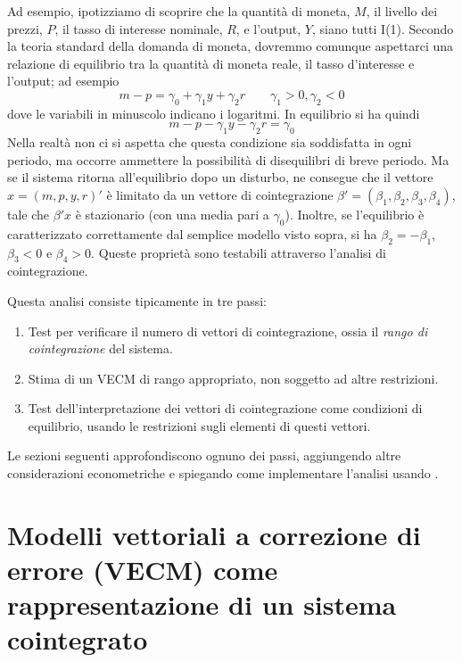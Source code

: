 Ad esempio, ipotizziamo di scoprire che la quantità di moneta, $M$, il livello
dei prezzi, $P$, il tasso di interesse nominale, $R$, e l'output, $Y$, siano
tutti I(1). Secondo la teoria standard della domanda di moneta, dovremmo
comunque aspettarci una relazione di equilibrio tra la quantità di moneta reale,
il tasso d'interesse e l'output; ad esempio
\[
m - p = \gamma_0 + \gamma_1 y + \gamma_2 r \qquad \gamma_1 > 0,
\gamma_2 < 0
\]
dove le variabili in minuscolo indicano i logaritmi. In equilibrio si ha quindi
\[
m - p - \gamma_1 y - \gamma_2 r = \gamma_0
\]
Nella realtà non ci si aspetta che questa condizione sia soddisfatta in ogni
periodo, ma occorre ammettere la possibilità di disequilibri di breve periodo.
Ma se il sistema ritorna all'equilibrio dopo un disturbo, ne consegue che
il vettore $x = (m, p, y, r)'$ è limitato da un vettore di cointegrazione
$\beta' = (\beta_1, \beta_2, \beta_3, \beta_4)$, tale che $\beta'x$ è
stazionario (con una media pari a $\gamma_0$). Inoltre, se l'equilibrio è
caratterizzato correttamente dal semplice modello visto sopra, si ha $\beta_2 =
-\beta_1$, $\beta_3 < 0$ e $\beta_4 > 0$. Queste proprietà sono testabili
attraverso l'analisi di cointegrazione.

Questa analisi consiste tipicamente in tre passi:
\begin{enumerate}
\item Test per verificare il numero di vettori di cointegrazione, ossia il 
  \emph{rango di cointegrazione} del sistema.
\item Stima di un VECM di rango appropriato, non soggetto ad altre restrizioni.
\item Test dell'interpretazione dei vettori di cointegrazione come condizioni di
  equilibrio, usando le restrizioni sugli elementi di questi vettori.
\end{enumerate}

Le sezioni seguenti approfondiscono ognuno dei passi, aggiungendo altre
considerazioni econometriche e spiegando come implementare l'analisi usando
.

\section{Modelli vettoriali a correzione di errore (VECM) come rappresentazione di
un sistema cointegrato}
\label{sec:VECM-rep}

